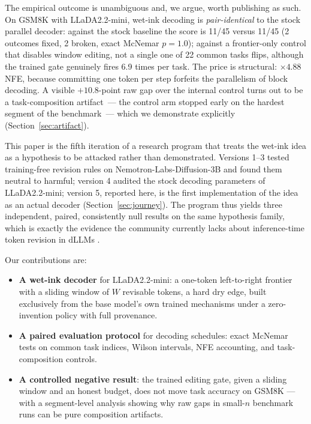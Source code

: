 \documentclass[11pt,a4paper]{article}
\begin{document}
The empirical outcome is unambiguous and, we argue, worth publishing as such. On GSM8K
with LLaDA2.2-mini, wet-ink decoding is \emph{pair-identical} to the stock parallel
decoder: against the stock baseline the score is 11/45 versus 11/45 (2 outcomes fixed,
2 broken, exact McNemar $p=1.0$); against a frontier-only control that disables window
editing, not a single one of 22 common tasks flips, although the trained gate genuinely
fires 6.9 times per task. The price is structural: $\times 4.88$ NFE, because committing
one token per step forfeits the parallelism of block decoding. A visible $+10.8$-point
raw gap over the internal control turns out to be a task-composition artifact~--- the
control arm stopped early on the hardest segment of the benchmark~--- which we
demonstrate explicitly (Section~\ref{sec:artifact}).

This paper is the fifth iteration of a research program that treats the wet-ink idea as
a hypothesis to be attacked rather than demonstrated. Versions 1--3 tested
training-free revision rules on Nemotron-Labs-Diffusion-3B and found them neutral to
harmful; version 4 audited the stock decoding parameters of LLaDA2.2-mini; version 5,
reported here, is the first implementation of the idea as an actual decoder
(Section~\ref{sec:journey}). The program thus yields three independent, paired,
consistently null results on the same hypothesis family, which is exactly the evidence
the community currently lacks about inference-time token revision in dLLMs
\citep{remeval}.

Our contributions are:
\begin{itemize}\itemsep2pt
  \item \textbf{A wet-ink decoder} for LLaDA2.2-mini: a one-token left-to-right
        frontier with a sliding window of $W$ revisable tokens, a hard dry edge, built
        exclusively from the base model's own trained mechanisms under a
        zero-invention policy with full provenance.
  \item \textbf{A paired evaluation protocol} for decoding schedules: exact McNemar
        tests on common task indices, Wilson intervals, NFE accounting, and
        task-composition controls.
  \item \textbf{A controlled negative result}: the trained editing gate, given a
        sliding window and an honest budget, does not move task accuracy on GSM8K ---
        with a segment-level analysis showing why raw gaps in small-$n$ benchmark runs
        can be pure composition artifacts.
\end{itemize}
\end{document}
